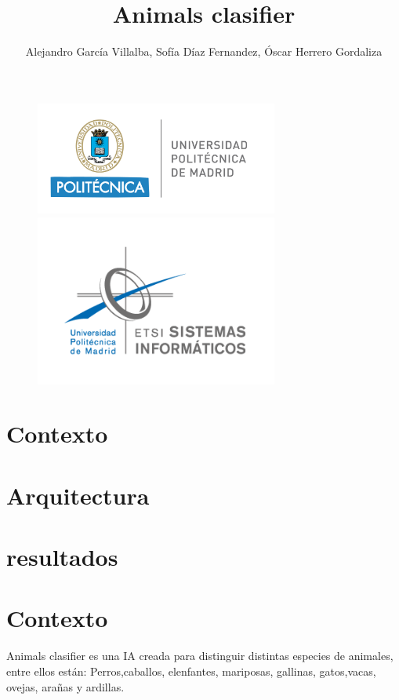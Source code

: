 \documentclass{article}
\title{Animals clasifier}
\author{Alejandro García Villalba, Sofía Díaz Fernandez, Óscar Herrero Gordaliza}
\begin{document}
    \maketitle
    \begin{figure}
        \centering
        \includegraphics[width=8cm]{politecnica_logo.png}
        \includegraphics[width=8cm]{etsisi_logo.png}       
    \end{figure}

    \newpage

    \tableofcontents
        \section{Contexto}
        \section{Arquitectura}
        \section{resultados}

    \newpage

    \section{Contexto}

    Animals clasifier es una IA creada para distinguir distintas especies de animales, entre ellos están: Perros,caballos, elenfantes, mariposas, 
    gallinas, gatos,vacas, ovejas, arañas y ardillas.\newline
    
\end{document}
